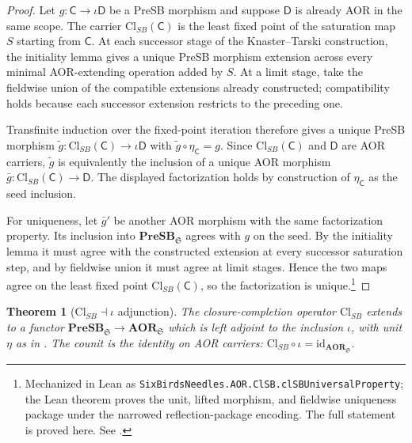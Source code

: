 \documentclass[11pt]{article}
\newcommand{\PreSB}{\mathbf{PreSB}}
\newcommand{\AOR}{\mathbf{AOR}}
\newcommand{\ClSB}{\mathrm{Cl}_{SB}}
\newtheorem{theorem}{Theorem}[section]
\theoremstyle{definition}
\begin{document}
\begin{proof}
Let \(g:\mathsf C\to\iota\mathsf D\) be a PreSB morphism and suppose
\(\mathsf D\) is already AOR in the same scope.  The carrier
\(\ClSB(\mathsf C)\) is the least fixed point of the saturation map \(S\)
starting from \(\mathsf C\).  At each successor stage of the
Knaster--Tarski construction, the initiality lemma gives a unique PreSB
morphism extension across every minimal AOR-extending operation added by
\(S\).  At a limit stage, take the fieldwise union of the compatible
extensions already constructed; compatibility holds because each successor
extension restricts to the preceding one.

Transfinite induction over the fixed-point iteration therefore gives a
unique PreSB morphism
\(\widetilde g:\ClSB(\mathsf C)\to\iota\mathsf D\) with
\(\widetilde g\circ\eta_{\mathsf C}=g\).  Since \(\ClSB(\mathsf C)\) and
\(\mathsf D\) are AOR carriers, \(\widetilde g\) is equivalently the
inclusion of a unique AOR morphism
\(\bar g:\ClSB(\mathsf C)\to\mathsf D\).  The displayed factorization
holds by construction of \(\eta_{\mathsf C}\) as the seed inclusion.

For uniqueness, let \(\bar g'\) be another AOR morphism with the same
factorization property.  Its inclusion into \(\PreSB_{\mathfrak S}\)
agrees with \(g\) on the seed.  By the initiality lemma it must agree
with the constructed extension at every successor saturation step, and
by fieldwise union it must agree at limit stages.  Hence the two maps
agree on the least fixed point \(\ClSB(\mathsf C)\), so the
factorization is unique.\footnote{Mechanized in Lean as \texttt{SixBirdsNeedles.AOR.ClSB.clSBUniversalProperty}; the Lean theorem proves the unit, lifted morphism, and fieldwise uniqueness package under the narrowed reflection-package encoding. The full statement is proved here. See .}
\end{proof}

\begin{theorem}[$\ClSB\dashv\iota$ adjunction]\label{thm:aor:cl-sb-adjunction}
The closure-completion operator $\ClSB$ extends to a functor
$\PreSB_{\mathfrak S}\to\AOR_{\mathfrak S}$ which is left adjoint to
the inclusion $\iota$, with unit $\eta$ as in
.  The counit is the identity on AOR
carriers: $\ClSB\circ\iota=\mathrm{id}_{\AOR_{\mathfrak S}}$.
\end{theorem}
\end{document}
